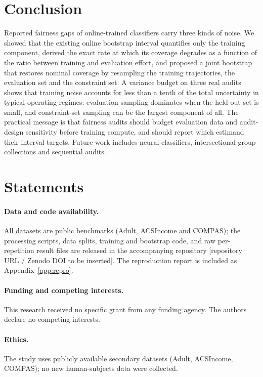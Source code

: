 \documentclass[10pt,twocolumn]{article}
\begin{document}
\section{Conclusion}
\label{sec:conclusion}
Reported fairness gaps of online-trained classifiers carry three kinds of noise.  We showed that the
existing online bootstrap interval quantifies only the training component, derived the exact rate at
which its coverage degrades as a function of the ratio between training and evaluation effort, and
proposed a joint bootstrap that restores nominal coverage by resampling the training trajectories,
the evaluation set and the constraint set.  A variance budget on three real audits shows that
training noise accounts for less than a tenth of the total uncertainty in typical operating regimes:
evaluation sampling dominates when the held-out set is small, and constraint-set sampling can be the
largest component of all.  The practical message is that fairness audits should budget evaluation
data and audit-design sensitivity before training compute, and should report which estimand their
interval targets.  Future work includes neural classifiers, intersectional group collections and
sequential audits.

\section*{Statements}

\paragraph{Data and code availability.} All datasets are public benchmarks (Adult, ACSIncome and
COMPAS); the processing scripts, data splits, training and bootstrap code, and raw per-repetition
result files are released in the accompanying repository [repository URL / Zenodo DOI to be
inserted].  The reproduction report is included as Appendix~\ref{app:repro}.

\paragraph{Funding and competing interests.} This research received no specific grant from any
funding agency.  The authors declare no competing interests.

\paragraph{Ethics.} The study uses publicly available secondary datasets (Adult, ACSIncome,
COMPAS); no new human-subjects data were collected.
\end{document}
